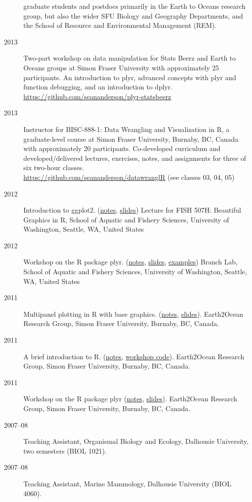 \begin{description}
graduate students and postdocs primarily in the Earth to Oceans research
group, but also the wider SFU Biology and Geography Departments, and the
School of Resource and Environmental Management (REM).
\item[2013]
Two-part workshop on data manipulation for Stats Beerz and Earth to
Oceans groups at Simon Fraser University with approximately 25
participants. An introduction to plyr, advanced concepts with plyr and
function debugging, and an introduction to dplyr.\\
\url{https://github.com/seananderson/plyr-statsbeerz}
\item[2013]
Instructor for BISC-888-1: Data Wrangling and Visualization in R, a
graduate-level course at Simon Fraser University, Burnaby, BC, Canada
with approximately 20 participants. Co-developed curriculum and
developed/delivered lectures, exercises, notes, and assignments for
three of six two-hour classes.\\
\url{https://github.com/seananderson/datawranglR} (see classes 03, 04,
05)
\item[2012]
Introduction to ggplot2.
(\href{http://seananderson.ca/courses/12-ggplot2/ggplot2_notes.pdf}{notes},
\href{http://seananderson.ca/courses/12-ggplot2/ggplot2_slides_with_examples.pdf}{slides})
Lecture for FISH 507H: Beautiful Graphics in R, School of Aquatic and
Fishery Sciences, University of Washington, Seattle, WA, United States
\item[2012]
Workshop on the R package plyr.
(\href{http://seananderson.ca/courses/12-plyr/plyr_2012.pdf}{notes},
\href{http://seananderson.ca/courses/12-plyr/plyr_2012_slides.pdf}{slides},
\href{http://seananderson.ca/courses/12-plyr/plyr_2012_examples.html}{examples})
Branch Lab, School of Aquatic and Fishery Sciences, University of
Washington, Seattle, WA, United States
\item[2011]
Multipanel plotting in R with base graphics.
(\href{http://seananderson.ca/courses/11-multipanel/multipanel.pdf}{notes},
\href{http://seananderson.ca/courses/11-multipanel/multipanel-slides.pdf}{slides}).
Earth2Ocean Research Group, Simon Fraser University, Burnaby, BC,
Canada.
\item[2011]
A brief introduction to R.
(\href{http://seananderson.ca/courses/11-rintro/RIntro.pdf}{notes},
\href{http://seananderson.ca/courses/11-rintro/RIntro.R}{workshop
code}). Earth2Ocean Research Group, Simon Fraser University, Burnaby,
BC, Canada.
\item[2011]
Workshop on the R package plyr
(\href{http://seananderson.ca/courses/11-plyr/plyr.pdf}{notes},
\href{http://seananderson.ca/courses/11-plyr/plyr-slides.pdf}{slides}).
Earth2Ocean Research Group, Simon Fraser University, Burnaby, BC,
Canada.
\item[2007--08]
Teaching Assistant, Organismal Biology and Ecology, Dalhousie
University, two semesters (BIOL 1021).
\item[2007--08]
Teaching Assistant, Marine Mammology, Dalhousie University (BIOL 4060).
\end{description}

